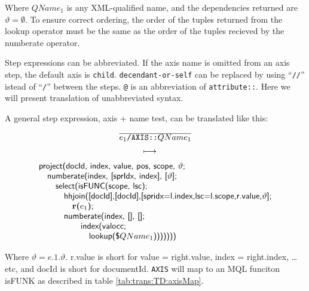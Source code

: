 Where $QName_1$ is any XML-qualified name, and the dependencies returned are $\vartheta = \emptyset$. To ensure
correct ordering, the order of the tuples returned from the \textsf{lookup} operator must be the same as the order
of the tuples recieved by the \textsf{numberate} operator. 

Step expressions can be abbreviated. If the axis name is omitted from an axis step, the default axis is
\texttt{child}. \texttt{decendant-or-self} can be replaced by using ``\texttt{//}'' istead of ``\texttt{/}''
between the steps. \texttt{@} is an abbreviation of \texttt{attribute::}. Here we will present translation of
unabbreviated syntax.

A general step expression, axis + name test, can be translated like this:
\begin{equation}
\begin{array}{c}
\frac{}{\displaystyle e_{1}\texttt{/AXIS::}QName_1} \\ 
\longmapsto \begin{array}{c}\mbox{\tiny } \\ \mbox{\tiny } \end{array} \\
\begin{array}{l}
\mbox{\textsf{project(docId, index, value, pos, scope, }}\vartheta\mbox{\textsf{;}} \\ \quad
\mbox{\textsf{numberate(index, [sprIdx, index], [}}\vartheta\mbox{\textsf{];}} \\ \quad\quad
\mbox{\textsf{select(isFUNC(scope, lsc);}} \\ \quad \quad\quad
\mbox{\textsf{hhjoin([docId],[docId],[spridx=l.index,lsc=l.scope,r.value,}}\vartheta\mbox{\textsf{];}}\\
\quad\quad\quad\quad \mbox{\textbf{r(}}e_1\mbox{\textbf{)}\textsf{;}} \\ \quad \quad\quad \mbox{\textsf{numberate(index, [], [];}}\\ \quad\quad\quad\quad\quad
\mbox{\textsf{index(valocc;}} \\ \quad\quad\quad\quad\quad\quad
\mbox{\textsf{lookup(\$}}QName_1\mbox{\textsf{)))))))}}
\end{array}
\end{array}
\label{rule:trans:TD:pathStep}
\end{equation}

Where $\vartheta = e.1.\vartheta$. \textsf{r.value} is short for \textsf{value = right.value, index = right.index,
\ldots etc}, and \textsf{docId} is short for \textsf{documentId}. \texttt{AXIS} will map to an MQL funciton
\textsf{isFUNK} as described in table \ref{tab:trans:TD:axisMap}.

